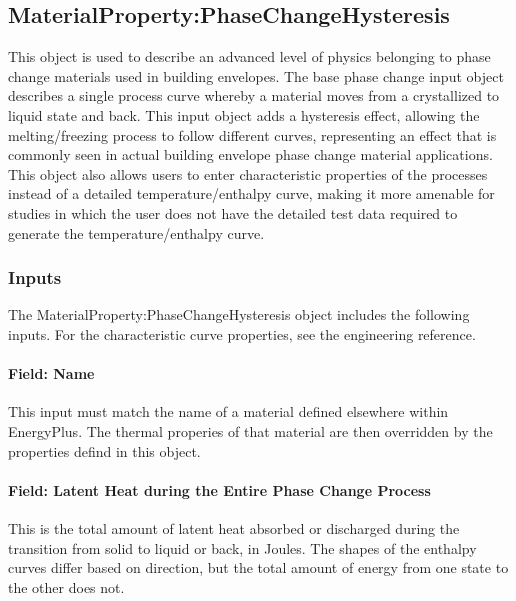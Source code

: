 \subsection{MaterialProperty:PhaseChangeHysteresis}\label{materialpropertyphasechangehysteresis}

This object is used to describe an advanced level of physics belonging to phase change materials used in building envelopes.
The base phase change input object describes a single process curve whereby a material moves from a crystallized to liquid state and back.
This input object adds a hysteresis effect, allowing the melting/freezing process to follow different curves, representing an effect that is commonly seen in actual building envelope phase change material applications.
This object also allows users to enter characteristic properties of the processes instead of a detailed temperature/enthalpy curve, making it more amenable for studies in which the user does not have the detailed test data required to generate the temperature/enthalpy curve.

\subsubsection{Inputs}\label{materialpropertyphasechangehysteresis-inputs}

The MaterialProperty:PhaseChangeHysteresis object includes the following inputs.  For the characteristic curve properties, see the engineering reference.

\paragraph{Field: Name}\label{materialpropertyphasechangehysteresis-name}

This input must match the name of a material defined elsewhere within EnergyPlus.  The thermal properies of that material are then overridden by the properties defind in this object.

\paragraph{Field: Latent Heat during the Entire Phase Change Process}\label{materialpropertyphasechangehysteresis-inputs-latent-heat-during-the-entire-phase-change-process}

This is the total amount of latent heat absorbed or discharged during the transition from solid to liquid or back, in Joules.
The shapes of the enthalpy curves differ based on direction, but the total amount of energy from one state to the other does not.

